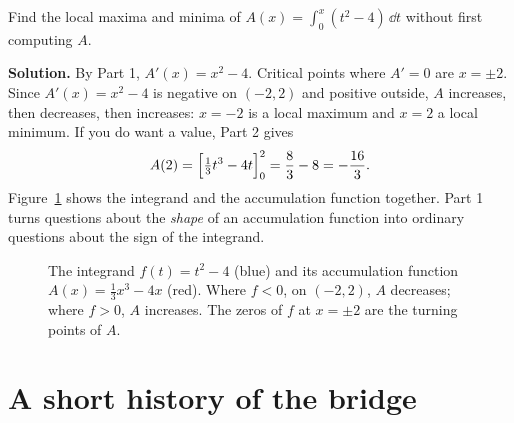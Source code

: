 \begin{example}\label{ch21:ex-both}
Find the local maxima and minima of $\displaystyle A(x)=\int_0^x (t^2-4)\,\dd t$
without first computing $A$.

\textbf{Solution.} By Part 1, $A'(x)=x^2-4$. Critical points where $A'=0$ are
$x=\pm 2$. Since $A'(x)=x^2-4$ is negative on $(-2,2)$ and positive outside, $A$
increases, then decreases, then increases: $x=-2$ is a local maximum and $x=2$ a
local minimum. If you do want a value, Part 2 gives
\[
  A(2)=\Big[\tfrac13 t^3-4t\Big]_{0}^{2}=\frac{8}{3}-8=-\frac{16}{3}.
\]
Figure~\ref{ch21:fig-both} shows the integrand and the accumulation function
together. Part 1 turns questions about the \emph{shape} of an accumulation
function into ordinary questions about the sign of the integrand.

\begin{figure}[htbp]
\centering
{}
\caption{The integrand $f(t)=t^2-4$ (blue) and its accumulation function
$A(x)=\tfrac13x^3-4x$ (red). Where $f<0$, on $(-2,2)$, $A$ decreases; where $f>0$,
$A$ increases. The zeros of $f$ at $x=\pm2$ are the turning points of $A$.}
\label{ch21:fig-both}
\end{figure}
\end{example}

\section{A short history of the bridge}

